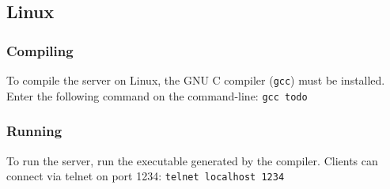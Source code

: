 \documentclass{article}
\begin{document}
\subsection{Linux}

\subsubsection*{Compiling}
To compile the server on Linux, the GNU C compiler (\texttt{gcc}) must be installed. Enter the following command on the command-line:\newline\newline
\texttt{gcc todo}
\subsubsection*{Running}
To run the server, run the executable generated by the compiler. Clients can connect via telnet on port 1234:\newline\newline
\texttt{telnet localhost 1234}
\end{document}

